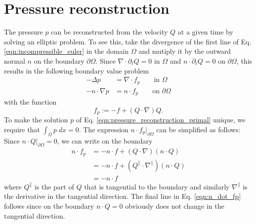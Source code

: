 \documentclass[11pt]{article}
\begin{document}
\section{Pressure reconstruction}
The pressure $p$ can be reconstructed from the velocity $Q$ at a given time by solving an elliptic problem. To see this, take the divergence of the first line of Eq. \eqref{eqn:incompressible_euler} in the domain $\Omega$ and mutiply it by the outward normal $n$ on the boundary $\partial \Omega$. Since $\nabla\cdot \partial_t Q = 0$ in $\Omega$ and $n\cdot \partial_t Q=0$ on $\partial \Omega$, this results in the following boundary value problem
\begin{equation}
    \begin{aligned}
        -\Delta p        & = \nabla \cdot f_p\qquad\text{in $\Omega$}    \\
        -n\cdot \nabla p & = n\cdot f_p \qquad\text{on $\partial\Omega$}
    \end{aligned}\label{eqn:pressure_reconstruction_primal}
\end{equation}
with the function
\begin{equation}
    f_p := -f + (Q\cdot \nabla) Q.
\end{equation}
To make the solution $p$ of Eq. \eqref{eqn:pressure_reconstruction_primal} unique, we require that $\int_\Omega p\;dx=0$. The expression $n\cdot f_p\vert_{\partial \Omega}$ can be simplified as follows: Since $n\cdot Q\vert_{\partial \Omega}=0$, we can write on the boundary
\begin{equation}
    \begin{aligned}
    n\cdot f_p &= -n\cdot f + (Q\cdot \nabla) (n\cdot Q) \\
    &= -n\cdot f+(Q^\parallel \cdot \nabla^\parallel)(n\cdot Q)\\
    &= -n\cdot f
    \end{aligned}\label{eqn:n_dot_fp}
\end{equation}
where $Q^\parallel$ is the part of $Q$ that is tangential to the boundary and similarly $\nabla^\parallel$ is the derivative in the tangential direction. The final line in Eq. \eqref{eqn:n_dot_fp} follows since on the boundary $n\cdot Q=0$ obviously does not change in the tangential direction.
\end{document}
